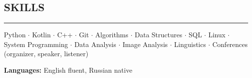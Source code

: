 \documentclass[11pt]{res} %
\let\orighref\href
\renewcommand{\href}[2]{\orighref{#1}{#2\,\faExternalLink}}
\begin{document}
\begin{resume}
\section{\uppercase{Skills}}
\begin{spacing}{0.3}
\textcolor[RGB]{220,220,220}{\rule{\linewidth}{0.4pt}} 
\end{spacing}
Python $\cdot$ Kotlin $\cdot$ C++ $\cdot$ Git $\cdot$ Algorithms $\cdot$ Data Structures $\cdot$ SQL $\cdot$ Linux $\cdot$ System Programming $\cdot$ Data Analysis $\cdot$ Image Analysis $\cdot$ Linguistics $\cdot$ Conferences (organizer, speaker, listener)


\textbf{Languages:} English fluent, Russian native

\end{resume}
\end{document}
